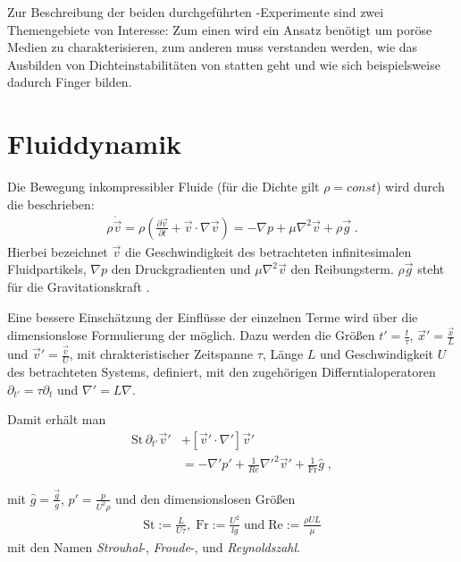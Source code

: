 \label{cha:theo}

Zur Beschreibung der beiden durchgeführten \HSCs-Experimente sind zwei Themengebiete von Interesse: Zum einen wird ein Ansatz benötigt um poröse Medien zu charakterisieren, zum anderen muss verstanden werden, wie das Ausbilden von Dichteinstabilitäten von statten geht und wie sich beispielsweise dadurch Finger bilden.


\section{Fluiddynamik}
\label{sec:hyd}
Die Bewegung inkompressibler Fluide (\dah für die Dichte gilt $\rho = const$) wird durch die \NSG beschrieben:
\begin{eqnarray}
 \rho \dot{\vec{v}} = \rho \left( \frac{\partial \vec{v}}{\partial t} + \vec{v} \cdot \nabla \vec{v} \right) = - \nabla p + \mu \nabla^2 \vec{v} + \rho\vec{g} \; .
\end{eqnarray}
Hierbei bezeichnet $\vec{v}$ die Geschwindigkeit des betrachteten infinitesimalen Fluidpartikels, $\nabla p$ den Druckgradienten und $\mu \nabla^2 \vec{v}$ den Reibungsterm. $\rho\vec{g}$ steht für die Gravitationskraft \citep{roth2005}.

Eine bessere Einschätzung der Einflüsse der einzelnen Terme wird über die dimensionslose Formulierung der \NSG möglich. Dazu werden die Größen $t' = \frac{t}{\tau}$,  $\vec{x}' = \frac{\vec{x}}{L}$ und $\vec{v}' = \frac{\vec{v}}{U}$, mit chrakteristischer Zeitspanne $\tau$, Länge $L$ und Geschwindigkeit $U$ des betrachteten Systems, definiert, mit den zugehörigen Differntialoperatoren $\partial_{t'} = \tau\partial_t$ und $\nabla' = L\nabla$. 

Damit erhält man
\begin{equation}
\begin{aligned}
 \mathrm{St} \, \partial_{t'} \vec{v}' &+ \left[\vec{v}' \cdot \nabla' \right]\vec{v}' \\
 &= -\nabla'p' + \frac{1}{Re}\nabla'^2\vec{v}' + \frac{1}{\mathrm{Fr}}\hat{g} \; ,
\end{aligned}
\end{equation}

mit $\hat{g} = \frac{\vec{g}}{g}$, $p' = \frac{p}{U^2\rho}$ und den dimensionslosen Größen 
\begin{align}
 \mathrm{St} := \frac{L}{U\tau}, \; \mathrm{Fr} := \frac{U^2}{lg} \; \mathrm{und}  \; \mathrm{Re} := \frac{\rho U L}{\mu}
 \label{eq:Re}
\end{align}
 mit den Namen \textit{Strouhal}-, \textit{Froude}-, und \textit{Reynoldszahl}.

